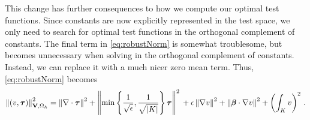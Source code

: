 \documentclass[letterpaper]{article}
\def\btau{\boldsymbol\tau}
\def\bbeta{\boldsymbol\beta}
\newcommand{\eqnref}[1]{\eqref{eq:#1}}
\newcommand{\norm}[1]{\left\| #1 \right\|}
\begin{document}
This change has further consequences to how we compute our optimal test
functions. Since constants are now explicitly represented in the test space,
we only need to search for optimal test functions in the orthogonal complement
of constants. The final term in \eqnref{robustNorm} is somewhat troublesome,
but becomes unnecessary when solving in the orthogonal complement of
constants. Instead, we can replace it with a much nicer zero mean term. Thus,
\eqnref{robustNorm} becomes
\begin{equation}
\norm{(v,\btau)}^2_{\mathbf{V},\Omega_h}=
\norm{\nabla\cdot\btau}^2+\norm{\min\left\{\frac{1}{\sqrt{\epsilon}},\frac{1}{\sqrt{|K|}}\right\}\btau}^2\\
+\epsilon\norm{\nabla v}^2+\norm{\bbeta\cdot\nabla
v}^2+\left(\int_Kv\right)^2\,.
\end{equation}



\end{document}
